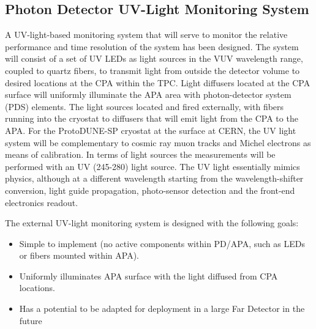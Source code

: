 \subsection{Photon Detector UV-Light Monitoring System}
\label{sec_pd_calib}


A UV-light-based monitoring system that will serve to monitor the relative performance and time resolution of the system has been designed. %
The system will consist of a set of UV LEDs as light sources in the VUV wavelength range, coupled to quartz fibers, to transmit light from outside the detector volume to desired locations at the CPA within the TPC.
Light diffusers located at the CPA surface will uniformly illuminate the APA area with photon-detector system (PDS) elements.
The light sources located and fired externally, with fibers running into the cryostat to diffusers that will emit light from the CPA to the APA. 
For the ProtoDUNE-SP cryostat at the surface at CERN, the UV light system will be complementary to cosmic ray muon 
tracks and Michel electrons as means of calibration. In terms of light sources the measurements will be performed with an UV (245-280) light source.
The UV light essentially mimics physics, although at a different wavelength starting from the wavelength-shifter conversion, 
light guide propagation, photo-sensor detection and the front-end electronics readout.
	
The external UV-light monitoring system is designed with the following goals:
				
\begin{itemize}
\item Simple to implement (no active components within PD/APA, such as LEDs or fibers mounted within APA).
\item Uniformly illuminates APA surface with the light diffused from CPA locations.
\item Has a potential to be adapted for deployment in a large Far Detector in the future
\end{itemize}

